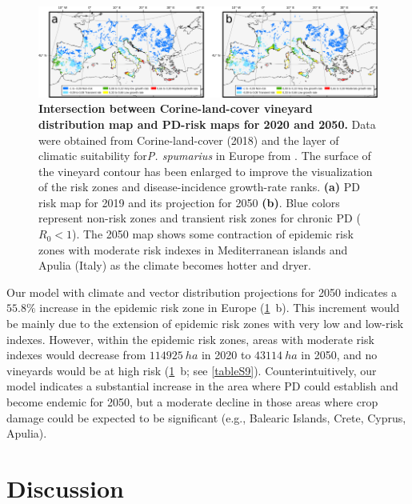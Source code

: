     \begin{figure}[H]
        \includegraphics[width=1\textwidth]{Figures/Fig6.png}
        \caption[PD risk in European vineyards for 2020 and
            2050]{\textbf{Intersection between Corine-land-cover vineyard
                distribution map and PD-risk maps for 2020 and 2050.}  Data
            were obtained from
            Corine-land-cover (2018) and the layer of climatic suitability
            for\textit{P.
                spumarius} in Europe from \cite{Godefroid2021}. The surface of
            the vineyard
            contour has been enlarged to improve the visualization of the risk
            zones and
            disease-incidence growth-rate ranks. \textbf{(a)} PD risk map for
            2019 and its
            projection for 2050 \textbf{(b)}. Blue colors represent non-risk
            zones and
            transient risk zones for chronic PD ($R_0 < 1$). The 2050 map shows
            some
            contraction of epidemic risk zones with moderate risk indexes in
            Mediterranean
            islands and Apulia (Italy) as the climate becomes hotter and
            dryer.}
        \label{fig6}
    \end{figure}

    Our model with climate and vector distribution projections for 2050
    indicates a $ 55.8 \% $ increase in the epidemic risk zone in Europe
    (\cref{fig6}~\textcolor{ref_color}{b}). This increment would be mainly due
    to the extension of
    epidemic risk zones with very low and low-risk indexes. However, within the
    epidemic risk zones, areas with moderate risk indexes would decrease from
$\SI{114925}{ha}$ in 2020 to $\SI{43114}{ha}$ in 2050, and no vineyards would
    be at high risk (\cref{fig6}~\textcolor{ref_color}{b}; see \cref{tableS9}).
    Counterintuitively, our model indicates a substantial increase in the area
    where PD could
    establish and become endemic for 2050, but a moderate decline in those
    areas where crop damage could be expected to be significant (e.g., Balearic
    Islands, Crete, Cyprus, Apulia).

    \section{Discussion}

